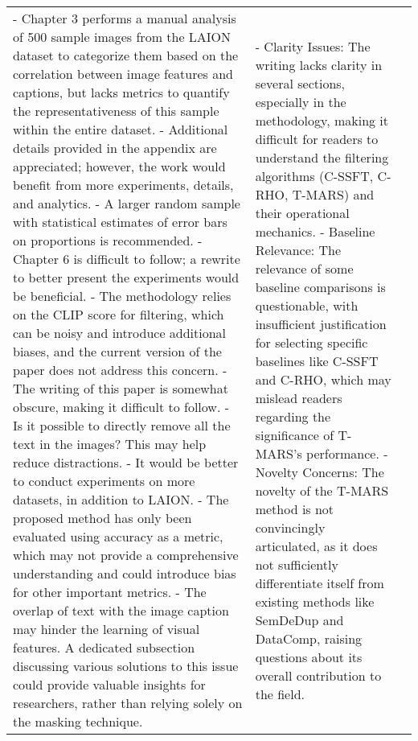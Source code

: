 \begin{table*}[htbp]
\begin{tabular}{p{3cm}p{6cm}p{6cm}}
- Chapter 3 performs a manual analysis of 500 sample images from the LAION dataset to categorize them based on the correlation between image features and captions, but lacks metrics to quantify the representativeness of this sample within the entire dataset.\newline
- Additional details provided in the appendix are appreciated; however, the work would benefit from more experiments, details, and analytics.\newline
- A larger random sample with statistical estimates of error bars on proportions is recommended.\newline
- Chapter 6 is difficult to follow; a rewrite to better present the experiments would be beneficial.\newline
- The methodology relies on the CLIP score for filtering, which can be noisy and introduce additional biases, and the current version of the paper does not address this concern.\newline
- The writing of this paper is somewhat obscure, making it difficult to follow.\newline
- Is it possible to directly remove all the text in the images? This may help reduce distractions.\newline
- It would be better to conduct experiments on more datasets, in addition to LAION.\newline
- The proposed method has only been evaluated using accuracy as a metric, which may not provide a comprehensive understanding and could introduce bias for other important metrics.\newline
- The overlap of text with the image caption may hinder the learning of visual features. A dedicated subsection discussing various solutions to this issue could provide valuable insights for researchers, rather than relying solely on the masking technique.
 &
- Clarity Issues: The writing lacks clarity in several sections, especially in the methodology, making it difficult for readers to understand the filtering algorithms (C-SSFT, C-RHO, T-MARS) and their operational mechanics.\newline
- Baseline Relevance: The relevance of some baseline comparisons is questionable, with insufficient justification for selecting specific baselines like C-SSFT and C-RHO, which may mislead readers regarding the significance of T-MARS's performance.\newline
- Novelty Concerns: The novelty of the T-MARS method is not convincingly articulated, as it does not sufficiently differentiate itself from existing methods like SemDeDup and DataComp, raising questions about its overall contribution to the field.\newline

\end{tabular}
\end{table*}

